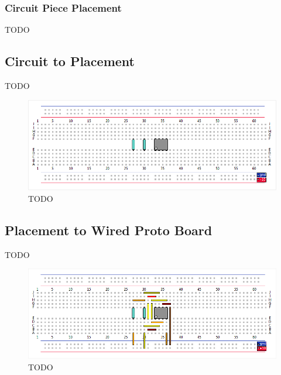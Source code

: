 \documentclass[12pt]{amsart}
\begin{document}
\subsubsection{Circuit Piece Placement}

TODO

\subsection{Circuit to Placement}

TODO

\begin{figure}
\includegraphics[width=\linewidth]{Images/Circuit_Piece_Placement.png}
\caption{TODO}
\label{fig:placement}
\end{figure}

\subsection{Placement to Wired Proto Board}

TODO

\begin{figure}
\includegraphics[width=\linewidth]{Images/Wired_Proto_Board.png}
\caption{TODO}
\label{fig:wired}
\end{figure}
\end{document}
